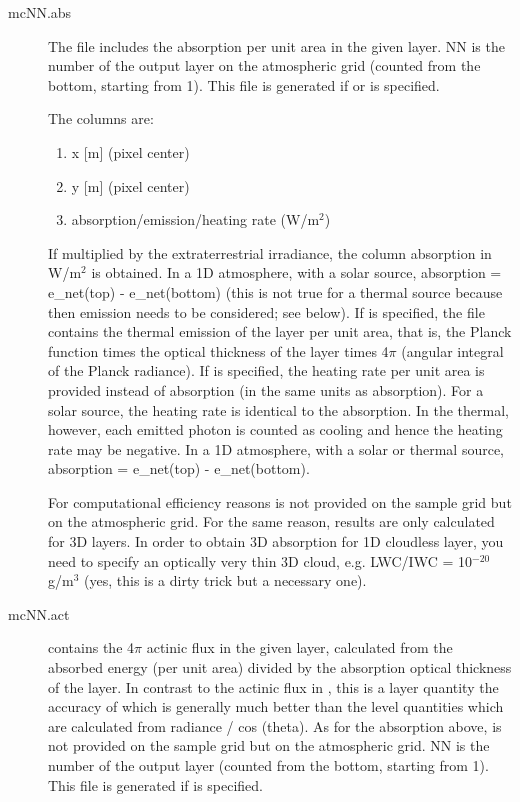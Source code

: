 \begin{description}
\item[mcNN.abs] 
  The file  includes the absorption per unit area in the given layer. 
  NN is the number of the output layer on the atmospheric 
  grid (counted from the bottom, starting from 1). This file is generated if  
  or  is specified.
  
  The columns are:
  \begin{enumerate}
  \item  x [m] (pixel center)
  \item  y [m] (pixel center)
  \item  absorption/emission/heating rate (W/m$^2$)
  \end{enumerate} 
  
  If multiplied by the extraterrestrial irradiance, the column 
  absorption in W/m$^2$ is obtained. In a 1D atmosphere, with a solar source,
  absorption = e\_net(top) - e\_net(bottom) (this is not true for a thermal
  source because then emission needs to be considered; see below). If
   is specified, the file contains the thermal emission of
  the layer per unit area, that is, the Planck function times the optical
  thickness of the layer times 4$\pi$ (angular integral of the Planck
  radiance). If  is specified, the heating rate per unit area is  
  provided instead of absorption (in the same units as absorption).
  For a solar source, the heating rate is identical to the absorption. 
  In the thermal, however, each emitted photon is counted as cooling 
  and hence the heating rate may be negative. In a 1D atmosphere, with a
  solar or thermal source, absorption = e\_net(top) - e\_net(bottom). 

  For computational efficiency reasons  is not provided on the
  sample grid but on the atmospheric grid. For the same reason, results are 
  only calculated for 3D layers. In order to obtain 3D absorption for 1D
  cloudless layer, you need to specify an optically very thin 3D cloud, e.g.
  LWC/IWC = 10$^{-20}$ g/m$^3$ (yes, this is a dirty trick but a necessary one). 

\item[mcNN.act] 
   contains the 4$\pi$ actinic flux in the given layer,
  calculated from the absorbed energy (per unit area) divided by the 
  absorption optical thickness of the layer. In contrast to the 
  actinic flux in , this is a layer quantity the 
  accuracy of which is generally much better than the level quantities 
  which are calculated from radiance / cos (theta). As for the absorption
  above,  is not provided on the sample grid but on the
  atmospheric grid. NN is the number of the output layer (counted from the
  bottom, starting from 1). This file is generated if  is specified. 
    

\end{description}

